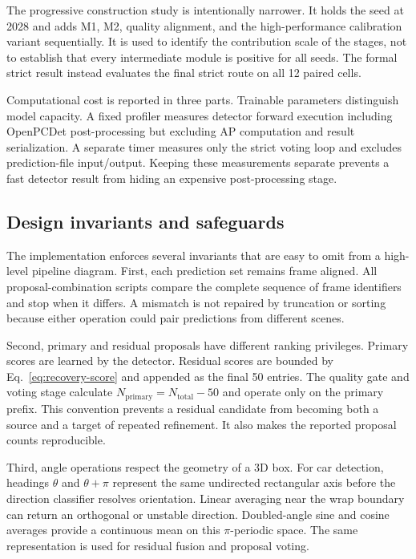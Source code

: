 \documentclass[preprint,12pt,times]{elsarticle}
\begin{document}
The progressive construction study is intentionally narrower. It holds the
seed at 2028 and adds M1, M2, quality alignment, and the high-performance
calibration variant sequentially. It is used to identify the contribution
scale of the stages, not to establish that every intermediate module is
positive for all seeds. The formal strict result instead evaluates the final
strict route on all 12 paired cells.

Computational cost is reported in three parts. Trainable parameters distinguish
model capacity. A fixed profiler measures detector forward execution including
OpenPCDet post-processing but excluding AP computation and result
serialization. A separate timer measures only the strict voting loop and
excludes prediction-file input/output. Keeping these measurements separate
prevents a fast detector result from hiding an expensive post-processing
stage.

\subsection{Design invariants and safeguards}

The implementation enforces several invariants that are easy to omit from a
high-level pipeline diagram. First, each prediction set remains frame aligned.
All proposal-combination scripts compare the complete sequence of frame
identifiers and stop when it differs. A mismatch is not repaired by truncation
or sorting because either operation could pair predictions from different
scenes.

Second, primary and residual proposals have different ranking privileges.
Primary scores are learned by the detector. Residual scores are bounded by
Eq.~\eqref{eq:recovery-score} and appended as the final 50 entries. The
quality gate and voting stage calculate
$N_{\mathrm{primary}}=N_{\mathrm{total}}-50$ and operate only on the primary
prefix. This convention prevents a residual candidate from becoming both a
source and a target of repeated refinement. It also makes the reported
proposal counts reproducible.

Third, angle operations respect the geometry of a 3D box. For car detection,
headings $\theta$ and $\theta+\pi$ represent the same undirected rectangular
axis before the direction classifier resolves orientation. Linear averaging
near the wrap boundary can return an orthogonal or unstable direction.
Doubled-angle sine and cosine averages provide a continuous mean on this
$\pi$-periodic space. The same representation is used for residual fusion and
proposal voting.
\end{document}
